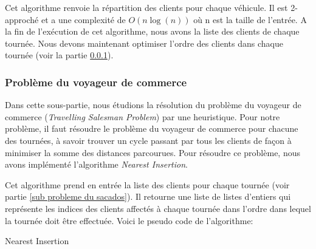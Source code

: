 Cet algorithme renvoie la répartition des clients pour chaque véhicule. Il est 2-approché et a une complexité de $O(n \log(n))$ où n est la taille de l'entrée. A la fin de l'exécution de cet algorithme, nous avons la liste des clients de chaque tournée. Nous devons maintenant optimiser l'ordre des clients dans chaque tournée (voir la partie \ref{sub voyageur de commerce}).

\subsubsection{Problème du voyageur de commerce}
\label{sub voyageur de commerce}

Dans cette sous-partie, nous étudions la résolution du problème du voyageur de commerce (\textit{Travelling Salesman Problem}) par une heuristique. Pour notre problème, il faut résoudre le problème du voyageur de commerce pour chacune des tournées, à savoir trouver un cycle passant par tous les clients de façon à minimiser la somme des distances parcourues. Pour résoudre ce problème, nous avons implémenté l'algorithme \textit{Nearest Insertion}.

Cet algorithme prend en entrée la liste des clients pour chaque tournée (voir partie \ref{sub probleme du sacados}). Il retourne une liste de listes d'entiers qui représente les indices des clients affectés à chaque tournée dans l'ordre dans lequel la tournée doit être effectuée. Voici le pseudo code de l'algorithme:

\begin{algorithm}[H]
    \label{A Nearest Insertion}
    \caption{Nearest Insertion}
\end{algorithm}

